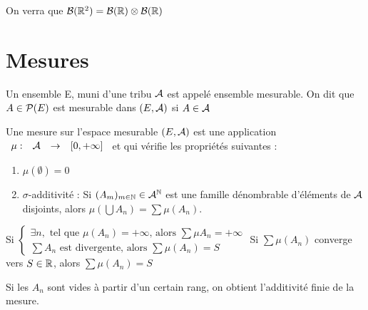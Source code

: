 \documentclass[]{report}
\begin{document}
\begin{ex}{}{}
    On verra que $\mathcal{B}(\mathbb{R}^2)=\mathcal{B}(\mathbb{R})\otimes\mathcal{B}(\mathbb{R})$
\end{ex}

\section{Mesures}

\begin{df}{}{}
    Un ensemble E, muni d'une tribu $\mathcal{A}$ est appelé ensemble mesurable. On dit que $A\in\mathcal{P}(E)$ est mesurable dans $(E,\mathcal{A})$ si $A\in \mathcal{A}$
\end{df}

\begin{df}{}{}
    Une mesure sur l'espace mesurable $(E,\mathcal{A})$ est une application $\begin{array}{ccccc} \mu : & \mathcal{A} & \to & [0,+\infty] \end{array}$ et qui vérifie les propriétés suivantes :
    \begin{enumerate}
        \item $\mu(\emptyset)=0$
        \item $\sigma$-additivité : Si $(A_m)_{m\in\mathbb{N}}\in \mathcal{A}^{\mathbb{N}}$ est une famille dénombrable d'éléments de $\mathcal{A}$ disjoints, alors $\mu(\bigcup A_n)=\sum\mu(A_n)$.
    \end{enumerate}
    Si $\left\{ \begin{array}{ll}
        \exists n,\text{ tel que }\mu(A_n)=+\infty\text{, alors }\sum\mu A_n=+\infty\\
        \sum A_n \text{ est divergente, alors }\sum\mu(A_n)=S
    \end{array}\right.$
    Si $\sum\mu(A_n)$ converge vers $S\in\mathbb{R}$, alors $\sum\mu (A_n)=S$
\end{df}

\begin{re}{}{}
    Si les $A_n$ sont vides à partir d'un certain rang, on obtient l'additivité finie de la mesure.
\end{re}
\end{document}
